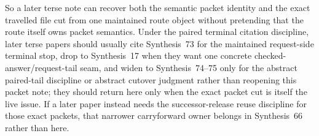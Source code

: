 \documentclass[11pt]{article}
\begin{document}
So a later terse note can recover both the semantic packet identity and the exact travelled file cut from one maintained route object without pretending that the route itself owns packet semantics. Under the paired terminal citation discipline, later terse papers should usually cite Synthesis~73 for the maintained request-side terminal stop, drop to Synthesis~17 when they want one concrete checked-answer/request-tail seam, and widen to Synthesis~74--75 only for the abstract paired-tail discipline or abstract cutover judgment rather than reopening this packet note; they should return here only when the exact packet cut is itself the live issue.\cite{series:pairedterminalcitationdiscipline,series:pairedterminalcutoverrules} If a later paper instead needs the successor-release reuse discipline for those exact packets, that narrower carryforward owner belongs in Synthesis~66 rather than here.
\end{document}
